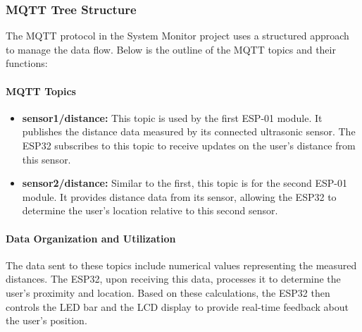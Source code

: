 \subsubsection{MQTT Tree Structure}
The MQTT protocol in the System Monitor project uses a structured approach to manage the data flow. Below is the outline of the MQTT topics and their functions:

\paragraph{MQTT Topics}
\begin{itemize}
    \item \textbf{sensor1/distance:} This topic is used by the first ESP-01 module. It publishes the distance data measured by its connected ultrasonic sensor. The ESP32 subscribes to this topic to receive updates on the user's distance from this sensor.
    \item \textbf{sensor2/distance:} Similar to the first, this topic is for the second ESP-01 module. It provides distance data from its sensor, allowing the ESP32 to determine the user's location relative to this second sensor.
\end{itemize}

\paragraph{Data Organization and Utilization}
The data sent to these topics include numerical values representing the measured distances. The ESP32, upon receiving this data, processes it to determine the user's proximity and location. Based on these calculations, the ESP32 then controls the LED bar and the LCD display to provide real-time feedback about the user's position.